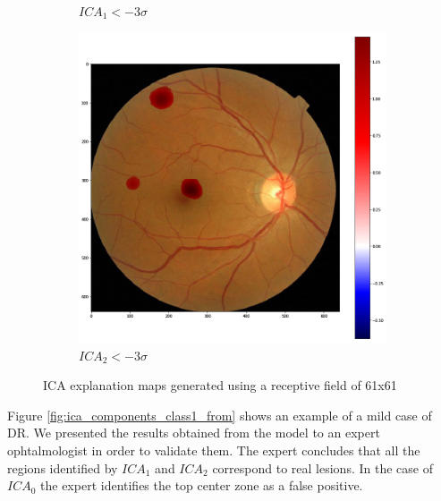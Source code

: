 \documentclass[review]{elsarticle}
\theoremstyle{definition} %
\theoremstyle{remark}
\begin{document}
\begin{figure}[h!]
\begin{subfigure}[b]{0.32\textwidth}
		\caption{$ICA_1 < - 3 \sigma$}	
	\end{subfigure}
	\begin{subfigure}[b]{0.32\textwidth}
		\centering
		\includegraphics[width=\textwidth]{./figures/ica_retine_maps/G1-P2/m02.png}
		\caption{$ICA_2 < - 3 \sigma$}	
	\end{subfigure}
	\hfill 
	\caption{ICA explanation maps generated using a receptive field of 61x61}  
	\label{fig:ica_components_class1} 
\end{figure}

Figure \ref{fig:ica_components_class1_from} shows an example of a mild case of DR. We presented the results obtained from the model to an expert ophtalmologist in order to validate them. The expert concludes that all the regions identified by $ICA_1$ and $ICA_2$ correspond to real lesions. In the case of $ICA_0$ the expert identifies the top center zone as a false positive.
\end{document}
